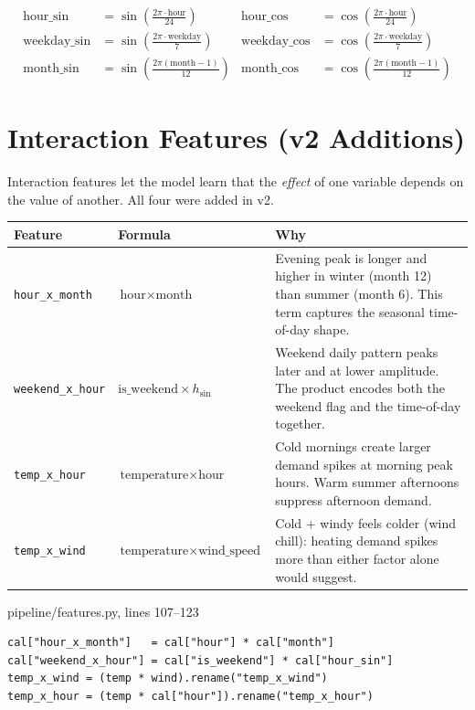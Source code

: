 \documentclass[12pt, a4paper, oneside]{memoir}
\newcommand{\code}[1]{\texttt{\footnotesize #1}}
\begin{document}
\begin{align}
  \text{hour\_sin}    &= \sin\!\left(\frac{2\pi \cdot \text{hour}}{24}\right) &
  \text{hour\_cos}    &= \cos\!\left(\frac{2\pi \cdot \text{hour}}{24}\right) \\
  \text{weekday\_sin} &= \sin\!\left(\frac{2\pi \cdot \text{weekday}}{7}\right) &
  \text{weekday\_cos} &= \cos\!\left(\frac{2\pi \cdot \text{weekday}}{7}\right) \\
  \text{month\_sin}   &= \sin\!\left(\frac{2\pi (\text{month}-1)}{12}\right) &
  \text{month\_cos}   &= \cos\!\left(\frac{2\pi (\text{month}-1)}{12}\right)
\end{align}

\section{Interaction Features (v2 Additions)}

Interaction features let the model learn that the \emph{effect} of one variable
depends on the value of another. All four were added in v2.

\begin{center}
\begin{tabularx}{\linewidth}{llX}
\toprule
\textbf{Feature} & \textbf{Formula} & \textbf{Why} \\
\midrule
\code{hour\_x\_month}   & $\text{hour} \times \text{month}$   & Evening peak is longer and higher in winter (month 12) than summer (month 6). This term captures the seasonal time-of-day shape. \\
\code{weekend\_x\_hour} & $\text{is\_weekend} \times h_{\sin}$& Weekend daily pattern peaks later and at lower amplitude. The product encodes both the weekend flag and the time-of-day together. \\
\code{temp\_x\_hour}    & $\text{temperature} \times \text{hour}$ & Cold mornings create larger demand spikes at morning peak hours. Warm summer afternoons suppress afternoon demand. \\
\code{temp\_x\_wind}    & $\text{temperature} \times \text{wind\_speed}$ & Cold + windy feels colder (wind chill): heating demand spikes more than either factor alone would suggest. \\
\bottomrule
\end{tabularx}
\end{center}

\begin{codefile}{pipeline/features.py, lines 107--123}
\begin{verbatim}
cal["hour_x_month"]   = cal["hour"] * cal["month"]
cal["weekend_x_hour"] = cal["is_weekend"] * cal["hour_sin"]
temp_x_wind = (temp * wind).rename("temp_x_wind")
temp_x_hour = (temp * cal["hour"]).rename("temp_x_hour")
\end{verbatim}
\end{codefile}
\end{document}

